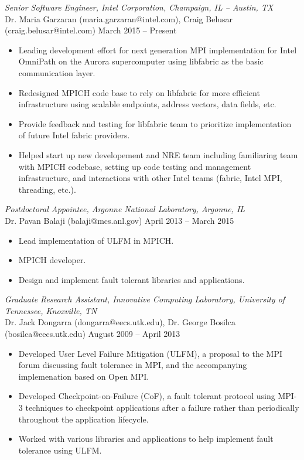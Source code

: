{\sl Senior Software Engineer, Intel Corporation, Champaign, IL -- Austin, TX} \\
Dr. Maria Garzaran (maria.garzaran@intel.com), Craig Belusar (craig.belusar@intel.com)
\hfill March 2015 -- Present
\begin{itemize} \itemsep -2pt
        \item Leading development effort for next generation MPI implementation
            for Intel OmniPath on the Aurora supercomputer using libfabric as
            the basic communication layer.
        \item Redesigned MPICH code base to rely on libfabric for more efficient
            infrastructure using scalable endpoints, address vectors, data
            fields, etc.
        \item Provide feedback and testing for libfabric team to prioritize
            implementation of future Intel fabric providers.
        \item Helped start up new developement and NRE team including
            familiaring team with MPICH codebase, setting up code testing and
            management infrastructure, and interactions with other Intel teams
            (fabric, Intel MPI, threading, etc.).
\end{itemize}

{\sl Postdoctoral Appointee, Argonne National Laboratory, Argonne, IL} \\
Dr. Pavan Balaji (balaji@mcs.anl.gov) \hfill April 2013 -- March 2015
\begin{itemize} \itemsep -2pt
        \item Lead implementation of ULFM in MPICH.
        \item MPICH developer.
        \item Design and implement fault tolerant libraries and applications.
\end{itemize}

{\sl Graduate Research Assistant, Innovative Computing Laboratory, University
of Tennessee, Knoxville, TN} \\
Dr. Jack Dongarra (dongarra@eecs.utk.edu), Dr. George Bosilca
(bosilca@eecs.utk.edu) \hfill August 2009 -- April 2013 
\begin{itemize} \itemsep -2pt %
        \item Developed User Level Failure Mitigation (ULFM), a proposal to
            the MPI forum discussing fault tolerance in MPI, and the
            accompanying implemenation based on Open MPI.
        \item Developed Checkpoint-on-Failure (CoF), a fault tolerant protocol
            using MPI-3 techniques to checkpoint applications after a failure
            rather than periodically throughout the application lifecycle.
        \item Worked with various libraries and applications to help
            implement fault tolerance using ULFM.
\end{itemize}

